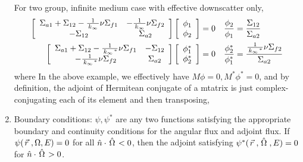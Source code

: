 \documentclass{school-22.211-notes}
\begin{document}
\begin{enumerate}
  For two group, infinite medium case with effective downscatter only, 
    \begin{align}
      \left[ \begin{array}{cc}
          \Sigma_{a1} + \Sigma_{12} - \frac{1}{\left. k_{\infty} \right.} \nu \Sigma_{f1} & - \frac{1}{\left. k_{\infty} \right.} \nu \Sigma_{f2} \\
          - \Sigma_{12} & \Sigma_{a2} \end{array} \right] 
      \left[ \begin{array}{c}
          \phi_1 \\ \phi_2 \end{array} \right] &= 0  
      &\frac{\phi_2}{\phi_1} &= \frac{\Sigma_{12}}{\Sigma_{a2}}   \\
      \left[ \begin{array}{cc}
          \Sigma_{a1} + \Sigma_{12} - \frac{1}{\left. k_{\infty} \right.^*} \nu \Sigma_{f1} & - \Sigma_{12} \\
          - \frac{1}{\left. k_{\infty} \right.^*} \nu \Sigma_{f2} & \Sigma_{a2} \end{array} \right] 
      \left[ \begin{array}{c}
          \phi_1^* \\ \phi_2^* \end{array} \right] &= 0  
      &\frac{\phi_2^*}{\phi_1^*} &= \frac{\frac{1}{\left. k_{\infty} \right.^*} \nu \Sigma_{f2}}{\Sigma_{a2}}  
    \end{align}
    where 
    In the above example, we effectively have $M \phi = 0, M^* \phi^* = 0$, and by definition, the adjoint of Hermitean conjugate of a mtatrix is just complex-conjugating each of its element and then transposing, 
 
  \item Boundary conditions: $\psi, \psi^*$ are any two functions satisfying the appropriate boundary and continuity conditions for the angular flux and adjoint flux. If $\psi(\left.\vec{r}\right., \Omega, E) = 0$ for all $\hat{n} \cdot \left. \hat{\Omega} \right. < 0$, then the adjoint satisfying $\psi^*(\left.\vec{r}\right., \left. \hat{\Omega} \right., E) = 0$ for $\hat{n} \cdot \left. \hat{\Omega} \right. > 0$. 


\end{enumerate}
\end{document}
